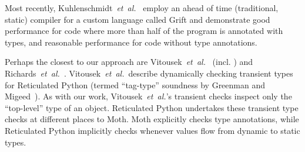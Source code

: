 Most recently, Kuhlenschmidt~\textit{et~al.}~\cite{Kuhlenschmidt:2018:preprint} employ an
ahead of time (\ie traditional, static) compiler for a custom
language called Grift and demonstrate good performance for code where more than
half of the program is annotated with types, and reasonable
performance for code without type annotations.

\label{reticRW}
Perhaps the closest to our approach are
Vitousek~\textit{et~al.}~\cite{reticPython2014} (incl. \citep{Vitousek2017,Greenman2018})
and Richards~\textit{et~al.}~\cite{Richards2017}.
Vitousek~\textit{et~al.}~describe dynamically checking transient types
for Reticulated Python (termed ``tag-type'' soundness by Greenman
and Migeed~\cite{Greenman2018}).
As with our work, Vitousek~\textit{et~al.}'s transient checks inspect
only the ``top-level'' type of an
object.
%
%
Reticulated Python undertakes these transient type checks at different
places to Moth.  Moth explicitly checks type annotations, while
Reticulated Python implicitly checks whenever values flow from dynamic
to static types.
%
%
